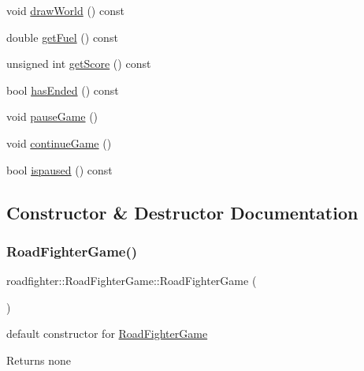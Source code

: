 \begin{DoxyCompactItemize}
\item 
void \hyperlink{classroadfighter_1_1RoadFighterGame_a404d5a9afcad9e907ffd7edb589ae6cd}{draw\+World} () const
\item 
double \hyperlink{classroadfighter_1_1RoadFighterGame_a0915aa65c2ba6aeab74207d17cab1cd4}{get\+Fuel} () const
\item 
unsigned int \hyperlink{classroadfighter_1_1RoadFighterGame_a842fda5659dc00e28dcad71bbee02e22}{get\+Score} () const
\item 
bool \hyperlink{classroadfighter_1_1RoadFighterGame_a0d14deca7704a246c4953c08a26d411d}{has\+Ended} () const
\item 
void \hyperlink{classroadfighter_1_1RoadFighterGame_a524013650ed53899e8ec56b54e31f1c7}{pause\+Game} ()
\item 
void \hyperlink{classroadfighter_1_1RoadFighterGame_a2fbb9632b4e3e143486cfef5f06c17a1}{continue\+Game} ()
\item 
bool \hyperlink{classroadfighter_1_1RoadFighterGame_a2458b6d49a2bbbb974d9924d87cf0206}{ispaused} () const
\end{DoxyCompactItemize}


\subsection{Constructor \& Destructor Documentation}
\mbox{\label{classroadfighter_1_1RoadFighterGame_a53d3c84fb27feef4e698e5d0e9f0a59a}} 
\subsubsection{\texorpdfstring{Road\+Fighter\+Game()}{RoadFighterGame()}\hspace{0.1cm}{\footnotesize\ttfamily [1/4]}}
{\footnotesize\ttfamily roadfighter\+::\+Road\+Fighter\+Game\+::\+Road\+Fighter\+Game (\begin{DoxyParamCaption}{ }\end{DoxyParamCaption})}

default constructor for \hyperlink{classroadfighter_1_1RoadFighterGame}{Road\+Fighter\+Game} \begin{DoxyReturn}{Returns}
none 
\end{DoxyReturn}

